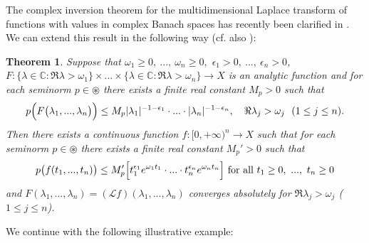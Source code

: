 \documentclass{amsart}
\newtheorem{thm}{Theorem}[section]
\theoremstyle{definition}
\theoremstyle{remark}
\numberwithin{equation}{section}
\begin{document}
The complex inversion theorem for the multidimensional Laplace transform of functions with values in complex Banach spaces has recently been clarified in \cite[Theorem 1]{axioms}. We can extend this result in the following way (cf. also \cite[Theorem 1.4.8]{FKP}):%

\begin{thm}\label{cit}
Suppose that $\omega_{1}\geq 0,\ ...,\ \omega_{n}\geq 0,$  $\epsilon_{1}>0 ,\ ...,\ \epsilon_{n}>0$, $F: \{\lambda \in {\mathbb C} : \Re \lambda>\omega_{1}\} \times ... \times \{\lambda \in {\mathbb C} : \Re \lambda>\omega_{n}\}\rightarrow X$ is an analytic function and for each seminorm $p\in \circledast$ there exists a finite real constant $M_{p}>0$ such that
\begin{align*} 
p\Bigl( F\bigl( \lambda_{1},...,\lambda_{n}\bigr) \Bigr) \leq M_{p}|\lambda_{1}|^{-1-\epsilon_{1}}\cdot ...\cdot |\lambda_{n}|^{-1-\epsilon_{n}},\quad \Re \lambda_{j}>\omega_{j}\ \ (1\leq j\leq n).
\end{align*}
Then there exists a continuous function
$f:[0,+\infty)^{n}\rightarrow X$ such that for each seminorm $p\in \circledast$ there exists a finite real constant $M_{p}'>0$ such that
\begin{align*}
p\bigl( f(t_{1},...,t_{n})\bigr)\leq M_{p}'\Bigl[t_{1}^{\epsilon_{1}}e^{\omega_{1}t_{1}}\cdot ...\cdot t_{n}^{\epsilon_{n}}e^{\omega_{n}t_{n}}\Bigr] \mbox{ for all }t_{1}\geq 0,\ ...,\ t_{n}\geq 0
\end{align*}
and $F(\lambda_{1},...,\lambda_{n})=({\mathcal L}f)(\lambda_{1},...,\lambda_{n})$ converges absolutely for $\Re \lambda_{j}>\omega_{j}$ ($1\leq j\leq n$).
\end{thm}

We continue with the following illustrative example:
\end{document}
